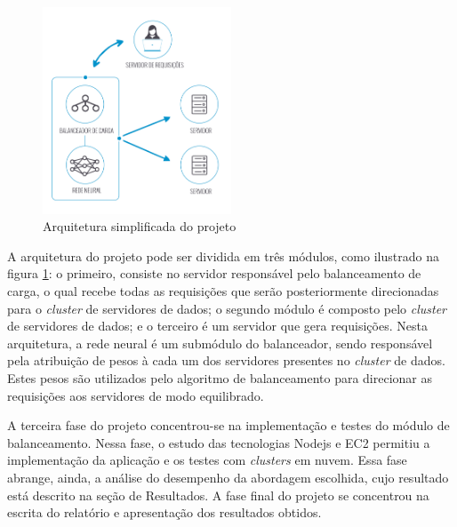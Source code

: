 \begin{figure}[htb]
	\caption{\label{fig:arq}Arquitetura simplificada do projeto}
	\begin{center}
		\includegraphics[width=0.50\textwidth]{img/projeto.png}
	\end{center}
\end{figure}

A arquitetura do projeto pode ser dividida em três módulos, como ilustrado na figura \ref{fig:arq}: o primeiro, consiste no servidor responsável pelo balanceamento de carga, o qual recebe todas as requisições que serão posteriormente direcionadas para o \textit{cluster} de servidores de dados; o segundo módulo é composto pelo \textit{cluster} de servidores de dados; e o terceiro é um servidor que gera requisições. Nesta arquitetura, a rede neural é um submódulo do balanceador, sendo responsável pela atribuição de pesos à cada um dos servidores presentes no \textit{cluster} de dados. Estes pesos são utilizados pelo algoritmo de balanceamento para direcionar as requisições aos servidores de modo equilibrado. 

A terceira fase do projeto concentrou-se na implementação e testes do módulo de balanceamento. Nessa fase, o estudo das tecnologias Nodejs e EC2 permitiu a implementação da aplicação e os testes com \textit{clusters} em nuvem.  Essa fase abrange, ainda, a análise do desempenho da abordagem escolhida, cujo resultado está descrito na seção de Resultados. A fase final do projeto se concentrou na escrita do relatório e apresentação dos resultados obtidos. 
